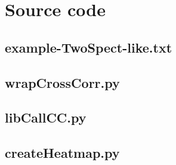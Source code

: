 \documentclass{article}
\begin{document}
\newpage

\appendix
\section{Source code}
\label{source_code_appendix}

\subsection{example-TwoSpect-like.txt}

\subsection{wrapCrossCorr.py}

\subsection{libCallCC.py}

\subsection{createHeatmap.py}

\end{document}
